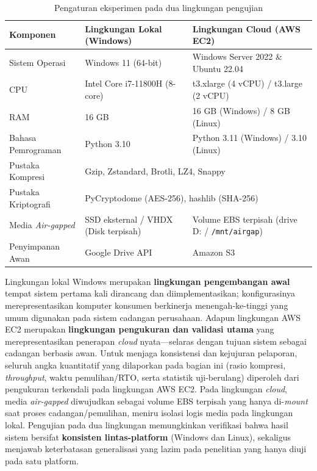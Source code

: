 \documentclass{iaesarticle}
\begin{document}
\begin{table}[H]
\centering
\fontsize{8pt}{10pt}\selectfont
\caption{Pengaturan eksperimen pada dua lingkungan pengujian}
\label{tab:experimental_setup}
\begin{tabularx}{\textwidth}{@{}l X X@{}}
\hline
\textbf{Komponen} & \textbf{Lingkungan Lokal (Windows)} & \textbf{Lingkungan Cloud (AWS EC2)} \\
\hline
Sistem Operasi & Windows 11 (64-bit) & Windows Server 2022 \& Ubuntu 22.04 \\
CPU & Intel Core i7-11800H (8-core) & t3.xlarge (4 vCPU) / t3.large (2 vCPU) \\
RAM & 16 GB & 16 GB (Windows) / 8 GB (Linux) \\
Bahasa Pemrograman & Python 3.10 & Python 3.11 (Windows) / 3.10 (Linux) \\
Pustaka Kompresi & \multicolumn{2}{l}{Gzip, Zstandard, Brotli, LZ4, Snappy} \\
Pustaka Kriptografi & \multicolumn{2}{l}{PyCryptodome (AES-256), hashlib (SHA-256)} \\
Media \textit{Air-gapped} & SSD eksternal / VHDX (Disk terpisah) & Volume EBS terpisah (drive D: / \texttt{/mnt/airgap}) \\
Penyimpanan Awan & Google Drive API & Amazon S3 \\
\hline
\end{tabularx}
\end{table}

Lingkungan lokal Windows merupakan \textbf{lingkungan pengembangan awal} tempat sistem pertama kali dirancang dan diimplementasikan; konfigurasinya merepresentasikan komputer konsumen berkinerja menengah-ke-tinggi yang umum digunakan pada sistem cadangan perusahaan. Adapun lingkungan AWS EC2 merupakan \textbf{lingkungan pengukuran dan validasi utama} yang merepresentasikan penerapan \textit{cloud} nyata---selaras dengan tujuan sistem sebagai cadangan berbasis awan. Untuk menjaga konsistensi dan kejujuran pelaporan, seluruh angka kuantitatif yang dilaporkan pada bagian ini (rasio kompresi, \textit{throughput}, waktu pemulihan/RTO, serta statistik uji-berulang) diperoleh dari pengukuran terkendali pada lingkungan AWS EC2. Pada lingkungan \textit{cloud}, media \textit{air-gapped} diwujudkan sebagai volume EBS terpisah yang hanya di-\textit{mount} saat proses cadangan/pemulihan, meniru isolasi logis media pada lingkungan lokal. Pengujian pada dua lingkungan memungkinkan verifikasi bahwa hasil sistem bersifat \textbf{konsisten lintas-platform} (Windows dan Linux), sekaligus menjawab keterbatasan generalisasi yang lazim pada penelitian yang hanya diuji pada satu platform.
\end{document}
